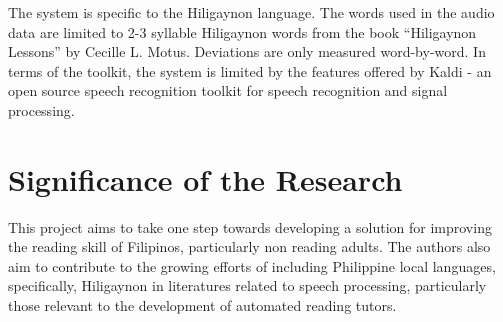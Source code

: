 The system is specific to the Hiligaynon language. The words used in the audio data are limited to 2-3 syllable Hiligaynon words from the book “Hiligaynon Lessons” by Cecille L. Motus. Deviations are only measured word-by-word. In terms of the toolkit, the system is limited by the features offered by Kaldi - an open source speech recognition toolkit for speech recognition and signal processing.

\section{Significance of the Research}
\label{sec:significance}

This project aims to take one step towards developing a solution for improving the reading skill of Filipinos, particularly non reading adults. The authors also aim to contribute to the growing efforts of including Philippine local languages, specifically, Hiligaynon in literatures related to speech processing, particularly those relevant to the development of automated reading tutors.


